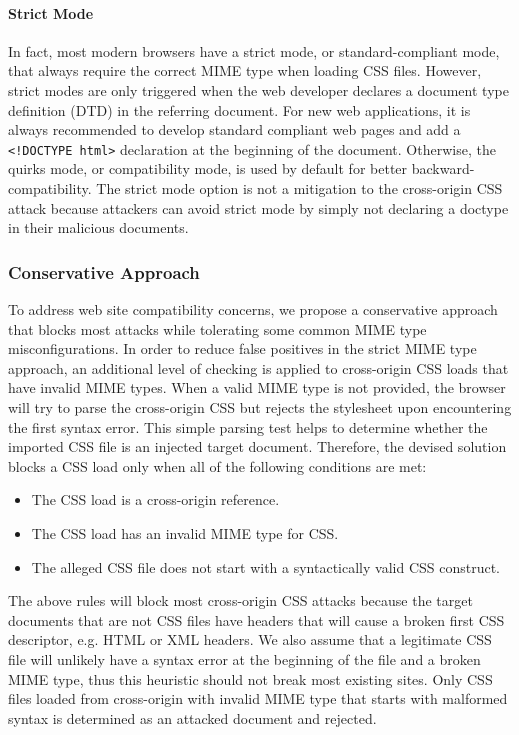 \documentclass{acm_proc_article-sp}
\begin{document}
\paragraph{Strict Mode}
In fact, most modern browsers have a strict mode, or standard-compliant mode,
that always require the correct MIME type when loading CSS files. However,
strict modes are only triggered when the web developer declares a document
type definition (DTD) in the referring document. For new web applications, it
is always recommended to develop standard compliant web pages and add a
\verb|<!DOCTYPE html>| declaration at the beginning of the document.
Otherwise, the quirks mode, or compatibility mode, is used by default for
better backward-compatibility. The strict mode option is not a mitigation to
the cross-origin CSS attack because attackers can avoid
strict mode by simply not declaring a doctype in their malicious documents.

\subsubsection{Conservative Approach}
To address web site compatibility concerns, we propose a conservative approach that blocks most attacks while tolerating some common MIME type misconfigurations. In order to reduce false positives in the strict MIME type approach, an additional level of checking is applied to cross-origin CSS loads that have invalid MIME types. When a valid MIME type is not provided, the browser will try to parse the cross-origin CSS but rejects the stylesheet upon encountering the first syntax error. This simple parsing test helps to determine whether the imported CSS file is an injected target document. Therefore, the devised solution blocks a CSS load only when all of the following conditions are met:
\begin{itemize}
\item{The CSS load is a cross-origin reference.}
\item{The CSS load has an invalid MIME type for CSS.}
\item{The alleged CSS file does not start with a syntactically valid CSS construct.}
\end{itemize}
The above rules will block most cross-origin CSS attacks because the target documents that are not CSS files have headers that will cause a broken first CSS descriptor, e.g. HTML or XML headers. We also assume that a legitimate CSS file will unlikely have a syntax error at the beginning of the file and a broken MIME type, thus this heuristic should not break most existing sites. Only CSS files loaded from cross-origin with invalid MIME type that starts with malformed syntax is determined as an attacked document and rejected.
\end{document}
